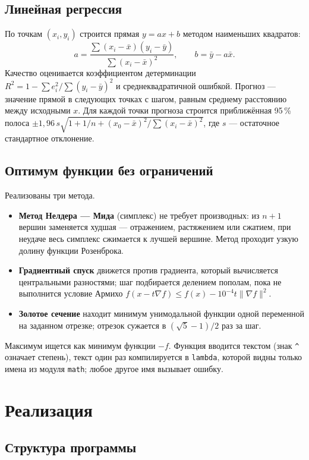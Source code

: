 \documentclass[14pt,a4paper]{extarticle}
\begin{document}
\subsection{Линейная регрессия}

По точкам $(x_i,y_i)$ строится прямая $y=ax+b$ методом наименьших квадратов:
\[
a=\frac{\sum (x_i-\bar x)(y_i-\bar y)}{\sum (x_i-\bar x)^2},\qquad b=\bar y-a\bar x .
\]
Качество оценивается коэффициентом детерминации $R^2=1-\sum e_i^2/\sum(y_i-\bar y)^2$ и
среднеквадратичной ошибкой. Прогноз --- значение прямой в следующих точках с шагом,
равным среднему расстоянию между исходными $x$. Для каждой точки прогноза строится
приближённая 95\,\% полоса
$\pm 1{,}96\,s\sqrt{1+1/n+(x_0-\bar x)^2/\sum(x_i-\bar x)^2}$, где $s$ --- остаточное
стандартное отклонение.

\subsection{Оптимум функции без ограничений}

Реализованы три метода.

\begin{itemize}
\item \textbf{Метод Нелдера --- Мида} (симплекс) не требует производных: из $n+1$
вершин заменяется худшая --- отражением, растяжением или сжатием, при неудаче весь
симплекс сжимается к лучшей вершине. Метод проходит узкую долину функции Розенброка.
\item \textbf{Градиентный спуск} движется против градиента, который вычисляется
центральными разностями; шаг подбирается делением пополам, пока не выполнится условие
Армихо $f(x-t\nabla f)\le f(x)-10^{-4}t\|\nabla f\|^2$.
\item \textbf{Золотое сечение} находит минимум унимодальной функции одной переменной
на заданном отрезке; отрезок сужается в $(\sqrt5-1)/2$ раз за шаг.
\end{itemize}

Максимум ищется как минимум функции $-f$. Функция вводится текстом (знак \texttt{\^{}}
означает степень), текст один раз компилируется в \texttt{lambda}, которой видны только
имена из модуля \texttt{math}; любое другое имя вызывает ошибку.

\section{Реализация}

\subsection{Структура программы}
\end{document}
